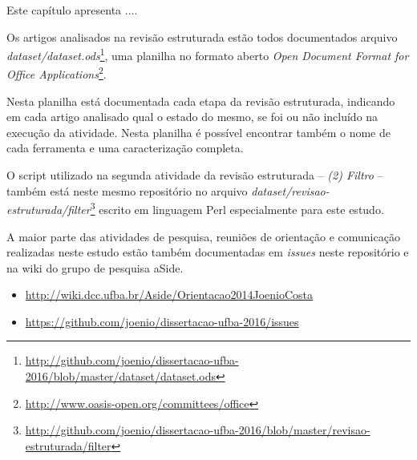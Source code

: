 {Este capítulo apresenta ....}
\label{reproducibilidade-do-estudo}



Os artigos analisados na revisão estruturada estão todos documentados arquivo
{\it
dataset/dataset.ods}\footnote{\url{http://github.com/joenio/dissertacao-ufba-2016/blob/master/dataset/dataset.ods}},
uma planilha no formato aberto {\it Open Document Format for Office
Applications}\footnote{\url{http://www.oasis-open.org/committees/office}}.

Nesta planilha está documentada cada etapa da revisão estruturada, indicando em
cada artigo analisado qual o estado do mesmo, se foi ou não incluído na
execução da atividade.  Nesta planilha é possível encontrar também o nome de
cada ferramenta e uma caracterização completa.

O script utilizado na segunda atividade da revisão estruturada -- {\it (2)
Filtro} -- também está neste mesmo repositório no arquivo {\it
dataset/revisao-estruturada/filter}\footnote{\url{http://github.com/joenio/dissertacao-ufba-2016/blob/master/revisao-estruturada/filter}}
escrito em linguagem Perl especialmente para este estudo.

A maior parte das atividades de pesquisa, reuniões de orientação e comunicação
realizadas neste estudo estão também documentadas em {\it issues} neste
repositório e na wiki do grupo de pesquisa aSide.

\begin{itemize}
  \item \url{http://wiki.dcc.ufba.br/Aside/Orientacao2014JoenioCosta}
  \item \url{https://github.com/joenio/dissertacao-ufba-2016/issues}
\end{itemize}
